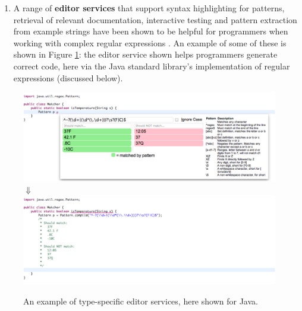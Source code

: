 \begin{enumerate}
\begin{enumerate}
	\end{enumerate}
\item A range of \textbf{editor services} that support syntax highlighting for patterns, retrieval of relevant documentation, interactive testing and pattern extraction from example strings have been shown to be helpful for programmers when working with complex regular expressions \cite{ACC_VLHCC}. An example of some of these is shown in Figure \ref{fig:regex-palette}: the editor service shown helps programmers generate correct code, here via the Java standard library's implementation of regular expressions (discussed below).
\end{enumerate}

\begin{figure}
\begin{center}
\includegraphics[scale=.55]{regex-palette.pdf}\\
$\Downarrow$ \\
\includegraphics[scale=.55]{regex-code-generated.pdf}
\end{center}
\vspace{-20px}
\caption{An example of type-specific editor services, here shown for Java.}
\label{fig:regex-palette}
\end{figure}

